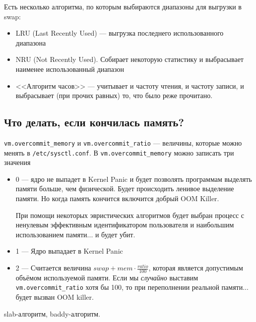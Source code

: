 Есть несколько алгоритма, по которым выбираются диапазоны для выгрузки в swap: 
\begin{itemize}
\item LRU (Last Recently Used) --- выгрузка последнего использованного диапазона
\item NRU (Not Recently Used). Собирает некоторую статистику и выбрасывает наименее использованный диапазон
\item <<Алгоритм часов>> --- учитывает и частоту чтения, и частоту записи, и выбрасывает (при прочих равных) то, что было реже прочитано.
\end{itemize}

\subsection{Что делать, если кончилась память?}

\verb!vm.overcommit_memory! и \verb!vm.overcommit_ratio! --- величины, которые можно менять в \linebreak \verb!/etc/sysctl.conf!. В \verb!vm.overcommit_memory! можно записать три значения

\begin{itemize}
\item 0 --- ядро не выпадет в Kernel Panic и будет позволять программам выделять памяти больше, чем физической. Будет происходить ленивое выделение памяти. Но когда память кончится включится добрый OOM Killer. 

При помощи некоторых эвристических алгоритмов будет выбран процесс с ненулевым эффективным идентификатором пользователя и наибольшим использованием памяти... и будет убит.

\item 1 --- Ядро выпадает в Kernel Panic

\item 2 --- Считается величина $swap + mem \cdot \frac{ratio}{100}$, которая является допустимым объёмом используемой памяти. Если мы \textit{случайно} выставим \verb!vm.overcommit_ratio! хотя бы 100, то при переполнении реальной памяти... будет вызван OOM killer.
\end{itemize} 

\begin{center}
slab-алгоритм, baddy-алгоритм.
\end{center}
